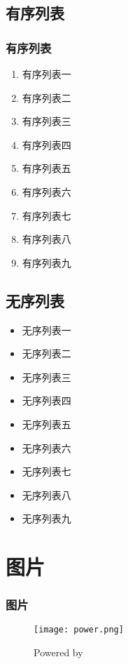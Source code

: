 \subsection{有序列表}
\begin{frame}
	\frametitle{有序列表}
	  \begin{enumerate}
		  \item 有序列表一
		  \item 有序列表二
		  \item 有序列表三
		  \item 有序列表四
		  \item 有序列表五
		  \item 有序列表六
		  \item 有序列表七
		  \item 有序列表八
		  \item 有序列表九
	  \end{enumerate}
\end{frame}
\subsection{无序列表}
\begin{frame}
	\begin{itemize}
		\item 无序列表一
		 \item 无序列表二
		 \item 无序列表三
		 \item 无序列表四
		 \item 无序列表五
		 \item 无序列表六
		 \item 无序列表七
		 \item 无序列表八
		 \item 无序列表九
	\end{itemize}
\end{frame}

\section{图片}
\begin{frame}
	\frametitle{图片}
	\begin{figure}[htbp]
    \centering
    \texttt{[image: power.png]}
    \caption{Powered by}
    \label{fig:power}
    \end{figure}
\end{frame}


